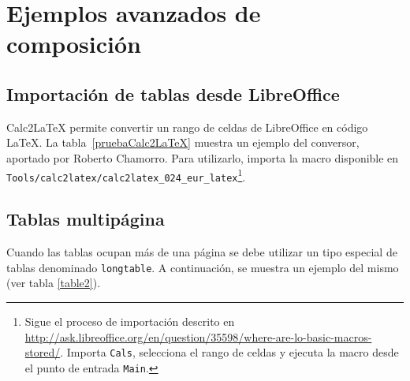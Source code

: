 %
%
%
% 
%
%
%
%

\chapter{Ejemplos avanzados de composición}
\label{cha:ejemplos-avanzados}


\section{Importación de tablas desde LibreOffice}
\label{sec:calc2latex}

Calc2LaTeX permite convertir un rango de celdas de LibreOffice en código \LaTeX{}. La tabla~\ref{pruebaCalc2LaTeX} muestra un ejemplo del conversor, aportado por Roberto Chamorro. Para utilizarlo, importa la macro disponible en \texttt{Tools/calc2latex/calc2latex\_024\_eur\_latex}\footnote{Sigue el proceso de importación descrito en \url{http://ask.libreoffice.org/en/question/35598/where-are-lo-basic-macros-stored/}. Importa \texttt{Cals}, selecciona el rango de celdas y ejecuta la macro desde el punto de entrada \texttt{Main}.}.




\section{Tablas multipágina}
\label{sec:tablas-multipagina}

Cuando las tablas ocupan más de una página se debe utilizar un tipo especial de tablas denominado \texttt{longtable}. A continuación, se muestra un ejemplo del mismo (ver tabla \ref{table2}).

